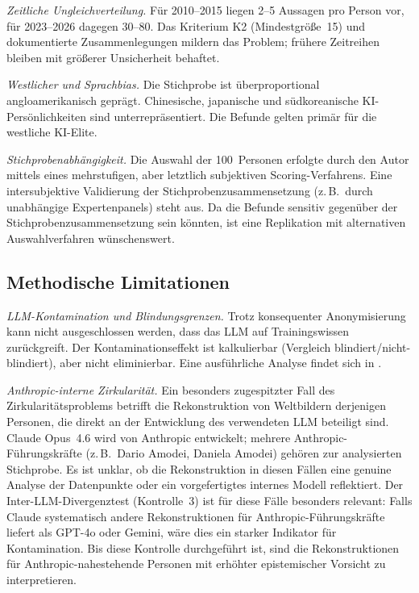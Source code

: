\documentclass[12pt,a4paper]{article}
\begin{document}
\emph{Zeitliche Ungleichverteilung.} F\"ur 2010--2015 liegen 2--5 Aussagen pro Person vor, f\"ur 2023--2026 dagegen 30--80. Das Kriterium K2 (Mindestgr\"o\ss{}e~15) und dokumentierte Zusammenlegungen mildern das Problem; fr\"uhere Zeitreihen bleiben mit gr\"o\ss{}erer Unsicherheit behaftet.

\emph{Westlicher und Sprachbias.} Die Stichprobe ist \"uberproportional angloamerikanisch gepr\"agt. Chinesische, japanische und s\"udkoreanische KI-Pers\"onlichkeiten sind unterrepr\"asentiert. Die Befunde gelten prim\"ar f\"ur die westliche KI-Elite.

\emph{Stichprobenabh\"angigkeit.} Die Auswahl der 100~Personen erfolgte durch den Autor mittels eines mehrstufigen, aber letztlich subjektiven Scoring-Verfahrens. Eine intersubjektive Validierung der Stichprobenzusammensetzung (z.\,B.\ durch unabh\"angige Expertenpanels) steht aus. Da die Befunde sensitiv gegen\"uber der Stichprobenzusammensetzung sein k\"onnten, ist eine Replikation mit alternativen Auswahlverfahren w\"unschenswert.


\subsection{Methodische Limitationen}

\emph{LLM-Kontamination und Blindungsgrenzen.} Trotz konsequenter Anonymisierung kann nicht ausgeschlossen werden, dass das LLM auf Trainingswissen zur\"uckgreift. Der Kontaminationseffekt ist kalkulierbar (Vergleich blindiert/nicht-blindiert), aber nicht eliminierbar. Eine ausf\"uhrliche Analyse findet sich in \citet{Geiger2026SWR}.

\emph{Anthropic-interne Zirkularit\"at.} Ein besonders zugespitzter Fall des Zirkularit\"atsproblems betrifft die Rekonstruktion von Weltbildern derjenigen Personen, die direkt an der Entwicklung des verwendeten LLM beteiligt sind. Claude Opus~4.6 wird von Anthropic entwickelt; mehrere Anthropic-F\"uhrungskr\"afte (z.\,B.\ Dario Amodei, Daniela Amodei) geh\"oren zur analysierten Stichprobe. Es ist unklar, ob die Rekonstruktion in diesen F\"allen eine genuine Analyse der Datenpunkte oder ein vorgefertigtes internes Modell reflektiert. Der Inter-LLM-Divergenztest (Kontrolle~3) ist f\"ur diese F\"alle besonders relevant: Falls Claude systematisch andere Rekonstruktionen f\"ur Anthropic-F\"uhrungskr\"afte liefert als GPT-4o oder Gemini, w\"are dies ein starker Indikator f\"ur Kontamination. Bis diese Kontrolle durchgef\"uhrt ist, sind die Rekonstruktionen f\"ur Anthropic-nahestehende Personen mit erh\"ohter epistemischer Vorsicht zu interpretieren.
\end{document}
